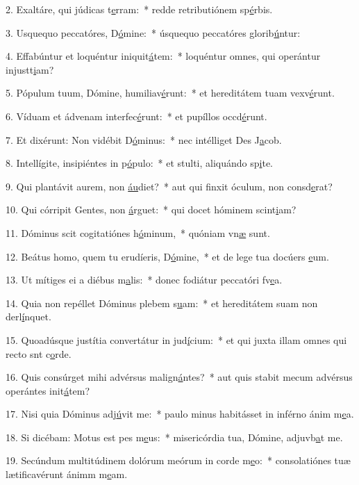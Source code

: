 2. Exaltáre, qui júdicas t\uline{e}rram:~* redde retributiónem sp\uline{é}rbis.\par 
3. Usquequo peccatóres, D\uline{ó}mine:~* úsquequo peccatóres glorib\uline{ú}ntur:\par 
4. Effabúntur et loquéntur iniquit\uline{á}tem:~* loquéntur omnes, qui operántur injustt\uline{i}am?\par 
5. Pópulum tuum, Dómine, humiliav\uline{é}runt:~* et hereditátem tuam vexv\uline{é}runt.\par 
6. Víduam et ádvenam interfec\uline{é}runt:~* et pupíllos occd\uline{é}runt.\par 
7. Et dixérunt: Non vidébit D\uline{ó}minus:~* nec intélliget Des J\uline{a}cob.\par 
8. Intellígite, insipiéntes in p\uline{ó}pulo:~* et stulti, aliquándo sp\uline{i}te.\par 
9. Qui plantávit aurem, non \uline{áu}diet?~* aut qui finxit óculum, non consd\uline{e}rat?\par 
10. Qui córripit Gentes, non \uline{á}rguet:~* qui docet hóminem scint\uline{i}am?\par 
11. Dóminus scit cogitatiónes h\uline{ó}minum,~* quóniam vn\uline{æ} sunt.\par 
12. Beátus homo, quem tu erudíeris, D\uline{ó}mine,~* et de lege tua docúers \uline{e}um.\par 
13. Ut mítiges ei a diébus m\uline{a}lis:~* donec fodiátur peccatóri fv\uline{e}a.\par 
14. Quia non repéllet Dóminus plebem s\uline{u}am:~* et hereditátem suam non derl\uline{í}nquet.\par 
15. Quoadúsque justítia convertátur in jud\uline{í}cium:~* et qui juxta illam omnes qui recto snt c\uline{o}rde.\par 
16. Quis consúrget mihi advérsus malign\uline{á}ntes?~* aut quis stabit mecum advérsus operántes init\uline{á}tem?\par 
17. Nisi quia Dóminus adj\uline{ú}vit me:~* paulo minus habitásset in inférno ánim m\uline{e}a.\par 
18. Si dicébam: Motus est pes m\uline{e}us:~* misericórdia tua, Dómine, adjuvb\uline{a}t me.\par 
19. Secúndum multitúdinem dolórum meórum in corde m\uline{e}o:~* consolatiónes tuæ lætificavérunt ánimm m\uline{e}am.\par 
